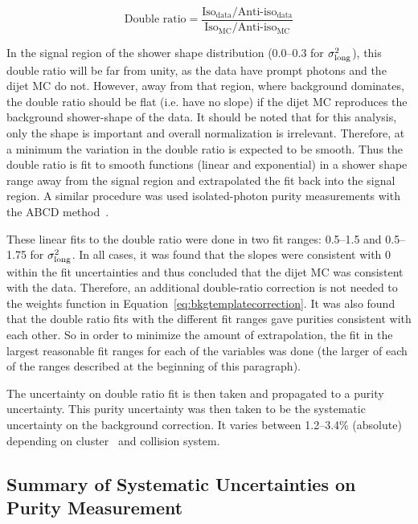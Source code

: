 \begin{equation}
    \text{Double ratio} = \frac{\text{Iso}_{\text{data}}/\text{Anti-iso}_{\text{data}}}{\text{Iso}_{\text{MC}}/\text{Anti-iso}_{\text{MC}}}
    \label{eq:bkgtemplatedoubleratio}
\end{equation}

In the signal region of the shower shape distribution (0.0--0.3 for $\sigma^{2}_{\mathrm{long}}$), this double ratio will be far from unity, as the data have prompt photons and the dijet MC do not. However, away from that region, where background dominates, the double ratio should be flat (i.e. have no slope) if the dijet MC reproduces the background shower-shape of the data. It should be noted that for this analysis, only the shape is important and overall normalization is irrelevant. Therefore, at a minimum the variation in the double ratio is expected to be smooth. Thus the double ratio is fit to smooth functions (linear and exponential) in a shower shape range away from the signal region and extrapolated the fit back into the signal region. A similar procedure was used isolated-photon purity measurements with the ABCD method~\cite{Acharya:2019jkx}.

These linear fits to the double ratio were done in two fit ranges: 0.5--1.5 and 0.5--1.75 for $\sigma^{2}_{\mathrm{long}}$. In all cases, it was found that the slopes were consistent with 0 within the fit uncertainties and thus concluded that the dijet MC was consistent with the data. Therefore, an additional double-ratio correction is not needed to the weights function in Equation~\ref{eq:bkgtemplatecorrection}. It was also found that the double ratio fits with the different fit ranges gave purities consistent with each other. So in order to minimize the amount of extrapolation, the fit in the largest reasonable fit ranges for each of the variables was done (the larger of each of the ranges described at the beginning of this paragraph). 

The uncertainty on double ratio fit is then taken and propagated to a purity uncertainty. This purity uncertainty was then taken to be the systematic uncertainty on the background correction. It varies between 1.2--3.4\% (absolute) depending on cluster \pt~and collision system.


\FloatBarrier
\subsection{Summary of Systematic Uncertainties on Purity Measurement}

